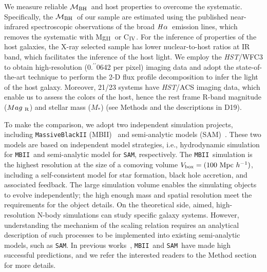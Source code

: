 \documentclass{natureprintstyle}
\newcommand{\hst}{{\it HST}}
\newcommand{\mbh}{$\mathcal M_{\rm BH}$}
\newcommand{\mr}{$Mag_{\rm ~R}$}
\newcommand{\halpha}{${\it H}\alpha$}
\newcommand{\mstar}{{$M_*$}}
\newcommand{\Mgii}{Mg$_{\rm II}$}
\newcommand{\Civ}{C$_{\rm IV}$}
\newcommand{\farcs}{\mbox{\ensuremath{.\!\!^{\prime\prime}}}}%
\newcommand{\sam}{\texttt{SAM}}
\newcommand{\mbii}{\texttt{MBII}}
\newcommand{\ding}[1]{\textcolor{red}{[{\bf Xuheng}: #1]}}
\begin{document}
We measure reliable \mbh\ and host properties to overcome the systematic. Specifically, the \mbh\ of our sample are estimated using the published near-infrared spectroscopic observations of the broad \halpha\ emission lines, which removes the systematic with \Mgii\ or \Civ. For the inference of properties of the host galaxies, the X-ray selected sample has lower nuclear-to-host ratios at IR band, which facilitates the inference of the host light. We employ the \hst/WFC3 to obtain high-resolution (0\farcs0642 per pixel) imaging data and adopt the state-of-the-art technique to perform the 2-D flux profile decomposition to infer the light of the host galaxy. Moreover, 21/23 systems have \hst/ACS imaging data, which enable us to assess the colors of the host, hence the rest frame R-band magnitude (\mr) and stellar mass (\mstar) (see Methods and the descriptions in D19). 


To make the comparison, we adopt two independent simulation projects, including \texttt{MassiveBlackII} (MBII)~\cite{Khandai2015} and semi-analytic models (SAM)~\cite{Menci2014}. These two models are based on independent model strategies, i.e., hydrodynamic simulation for \mbii\ and semi-analytic model for \sam, respectively. The \mbii\ simulation is the highest resolution at the size of a comoving volume $V_{\rm box} = (100~{\rm Mpc}~h^{-1})$, including a self-consistent model for star formation, black hole accretion, and associated feedback. The large simulation volume enables the simulating objects to evolve independently; the high enough mass and spatial resolution meet the requirements for the object details. On the theoretical side, aimed, high-resolution N-body simulations can study specific galaxy systems. However, understanding the mechanism of the scaling relation requires an analytical description of such processes to be implemented into existing semi-analytic models, such as \sam. In previous works~\cite{Huang2018, DeG++15, Khandai2015, Bhowmick2019, Menci2014, Menci2016}, \mbii\ and \sam\ have made high successful predictions, and we refer the interested readers to the Method section for more details.
\end{document}

